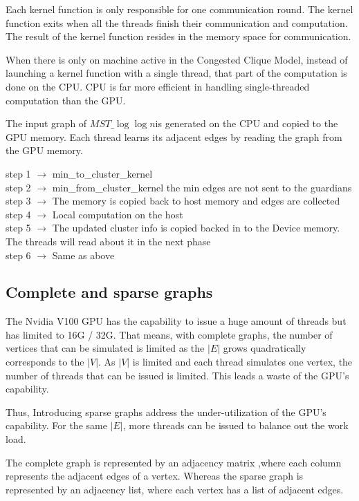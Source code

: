 \documentclass[english, 12pt, a4paper, elec, utf8, a-2b, online]{aaltothesis}
\newcommand{\mstalgo}{$MST\_\log\log{n}$}
\begin{document}
Each kernel function is only responsible for one communication round. The kernel function exits when all the threads finish their communication and computation. The result of the kernel function resides in the memory space for communication. 

When there is only on machine active in the Congested Clique Model, instead of launching a kernel function with a single thread, that part of the computation is done on the CPU. CPU is far more efficient in handling single-threaded computation than the GPU. 

The input graph of \mstalgo is generated on the CPU and copied to the GPU memory. Each thread learns its adjacent edges by reading the graph from the GPU memory. 

step 1 $\rightarrow$ min\_to\_cluster\_kernel\\
step 2 $\rightarrow$ min\_from\_cluster\_kernel the min edges are not sent to the guardians\\
step 3 $\rightarrow$ The memory is copied back to host memory and edges are collected\\
step 4 $\rightarrow$ Local computation on the host\\
step 5 $\rightarrow$ The updated cluster info is copied backed in to the Device memory. The threads will read about it in the next phase\\
step 6 $\rightarrow$ Same as above\\
\subsection{Complete and sparse graphs}
The Nvidia V100 GPU has the capability to issue a huge amount of threads but has limited to 16G / 32G. That means, with complete graphs, the number of vertices that can be simulated is limited as the $|E|$ grows quadratically corresponds to the $|V|$. As $|V|$ is limited and each thread simulates one vertex, the number of threads that can be issued is limited. This leads a waste of the GPU's capability. 

Thus, Introducing sparse graphs address the under-utilization of the GPU's capability. For the same $|E|$, more threads can be issued to balance out the work load.

The complete graph is represented by an adjacency matrix ,where each column represents the adjacent edges of a vertex. Whereas the sparse graph is represented by an adjacency list, where each vertex has a list of adjacent edges. 
\end{document}
